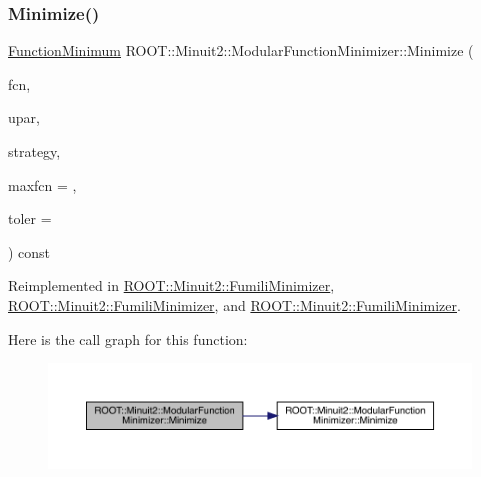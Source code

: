 \subsubsection{\texorpdfstring{Minimize()}{Minimize()}\hspace{0.1cm}{\footnotesize\ttfamily [15/33]}}
{\footnotesize\ttfamily \mbox{\hyperlink{classROOT_1_1Minuit2_1_1FunctionMinimum}{Function\+Minimum}} R\+O\+O\+T\+::\+Minuit2\+::\+Modular\+Function\+Minimizer\+::\+Minimize (\begin{DoxyParamCaption}\item[{const \mbox{\hyperlink{classROOT_1_1Minuit2_1_1FCNBase}{F\+C\+N\+Base}} \&}]{fcn,  }\item[{const \mbox{\hyperlink{classROOT_1_1Minuit2_1_1MnUserParameters}{Mn\+User\+Parameters}} \&}]{upar,  }\item[{const \mbox{\hyperlink{classROOT_1_1Minuit2_1_1MnStrategy}{Mn\+Strategy}} \&}]{strategy,  }\item[{unsigned int}]{maxfcn = {},  }\item[{double}]{toler = {} }\end{DoxyParamCaption}) const\hspace{0.3cm}{\ttfamily [virtual]}}



Reimplemented in \mbox{\hyperlink{classROOT_1_1Minuit2_1_1FumiliMinimizer_a22c4059fb94d5e40c843ac90440d2975}{R\+O\+O\+T\+::\+Minuit2\+::\+Fumili\+Minimizer}}, \mbox{\hyperlink{classROOT_1_1Minuit2_1_1FumiliMinimizer_a22c4059fb94d5e40c843ac90440d2975}{R\+O\+O\+T\+::\+Minuit2\+::\+Fumili\+Minimizer}}, and \mbox{\hyperlink{classROOT_1_1Minuit2_1_1FumiliMinimizer_a22c4059fb94d5e40c843ac90440d2975}{R\+O\+O\+T\+::\+Minuit2\+::\+Fumili\+Minimizer}}.

Here is the call graph for this function\+:
\nopagebreak
\begin{figure}[H]
\begin{center}
\leavevmode
\includegraphics[width=350pt]{d3/dc8/classROOT_1_1Minuit2_1_1ModularFunctionMinimizer_a93dcf0b210bf0f3ffba5b7b1099751e6_cgraph}
\end{center}
\end{figure}
\mbox{\label{classROOT_1_1Minuit2_1_1ModularFunctionMinimizer_a71fd7fab341881d9d082d4d2d5f5ed2d}} 
